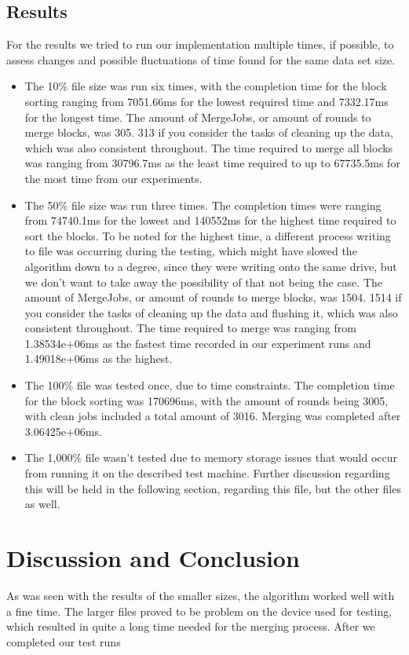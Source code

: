 \documentclass[twocolumn]{article}
\begin{document}
\subsection{Results}%
\label{sub:Results}
For the results we tried to run our implementation multiple times, if possible, to assess changes and possible fluctuations of time found for the same data set size.\\
\begin{itemize}
	\item The 10\% file size was run six times, with the completion time for the block sorting ranging from 7051.66ms for the lowest required time and 7332.17ms for the longest time. The amount of MergeJobs, or amount of rounds to merge blocks, was 305. 313 if you consider the tasks of cleaning up the data, which was also consistent throughout. The time required to merge all blocks was ranging from 30796.7ms as the least time required to up to 67735.5ms for the most time from our experiments.
	\item The 50\% file size was run three times. The completion times were ranging from 74740.1ms for the lowest and 140552ms for the highest time required to sort the blocks. To be noted for the highest time, a different process writing to file was occurring during the testing, which might have slowed the algorithm down to a degree, since they were writing onto the same drive, but we don't want to take away the possibility of that not being the case. The amount of MergeJobs, or amount of rounds to merge blocks, was 1504. 1514 if you consider the tasks of cleaning up the data and flushing it, which was also consistent throughout. The time required to merge was ranging from 1.38534e+06ms as the fastest time recorded in our experiment runs and 1.49018e+06ms as the highest. 
	\item The 100\% file was tested once, due to time constraints. The completion time for the block sorting was 170696ms, with the amount of rounds being 3005, with clean jobs included a total amount of 3016. Merging was completed after 3.06425e+06ms.
	\item The 1,000\% file wasn't tested due to memory storage issues that would occur from running it on the described test machine. Further discussion regarding this will be held in the following section, regarding this file, but the other files as well.
\end{itemize}

\section{Discussion and Conclusion}
As was seen with the results of the smaller sizes, the algorithm worked well with a fine time. The larger files proved to be problem on the device used for testing, which resulted in quite a long time needed for the merging process. After we completed our test runs 
\end{document}

